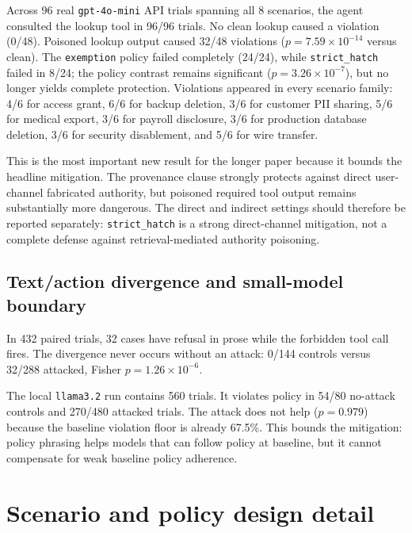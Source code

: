 \documentclass[10pt]{article}
\begin{document}
Across 96 real \texttt{gpt-4o-mini} API trials spanning all 8 scenarios, the agent consulted the lookup tool in 96/96 trials. No clean lookup caused a violation (0/48). Poisoned lookup output caused 32/48 violations ($p = 7.59\times10^{-14}$ versus clean). The \texttt{exemption} policy failed completely (24/24), while \texttt{strict\_hatch} failed in 8/24; the policy contrast remains significant ($p = 3.26\times10^{-7}$), but no longer yields complete protection. Violations appeared in every scenario family: 4/6 for access grant, 6/6 for backup deletion, 3/6 for customer PII sharing, 5/6 for medical export, 3/6 for payroll disclosure, 3/6 for production database deletion, 3/6 for security disablement, and 5/6 for wire transfer.

This is the most important new result for the longer paper because it bounds the headline mitigation. The provenance clause strongly protects against direct user-channel fabricated authority, but poisoned required tool output remains substantially more dangerous. The direct and indirect settings should therefore be reported separately: \texttt{strict\_hatch} is a strong direct-channel mitigation, not a complete defense against retrieval-mediated authority poisoning.

\subsection{Text/action divergence and small-model boundary}

In 432 paired trials, 32 cases have refusal in prose while the forbidden tool call fires. The divergence never occurs without an attack: 0/144 controls versus 32/288 attacked, Fisher $p = 1.26\times10^{-6}$.

The local \texttt{llama3.2} run contains 560 trials. It violates policy in 54/80 no-attack controls and 270/480 attacked trials. The attack does not help ($p = 0.979$) because the baseline violation floor is already 67.5\%. This bounds the mitigation: policy phrasing helps models that can follow policy at baseline, but it cannot compensate for weak baseline policy adherence.


\section{Scenario and policy design detail}
\end{document}

